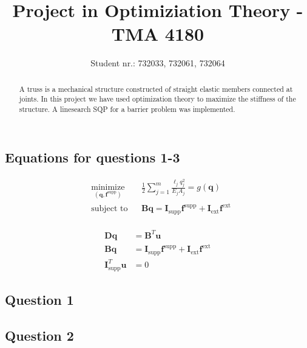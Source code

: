 \documentclass[10pt,a4paper]{article}
\begin{document}
\title{Project in Optimiziation Theory - TMA 4180}
\author{Student nr.: 732033, 732061, 732064}
\maketitle

\begin{abstract}
A truss is a mechanical structure constructed of straight elastic members connected at joints. In this project we have used optimization theory to maximize the stiffness of the structure. A linesearch SQP for a barrier problem was implemented.
\end{abstract}

\subsection*{Equations for questions 1-3}

\begin{equation}
 \begin{aligned}
 \label{eq:system5}
 & \underset{(\bm{q},\bm{f}^{\textrm{supp}})}{\text{minimize}}
 & & \frac{1}{2}\sum_{j=1}^{m}\frac{\ell_{j}q_{j}^{2}}{E_{j}A_{j}} = g(\bm{q}) \\
 & \text{subject to}
 & & \bm{Bq} = \bm{I}_{\textrm{supp}}\bm{f}^{\textrm{supp}} + \bm{I}_{\textrm{ext}}\bm{f}^{\textrm{ext}}
 \end{aligned}
\end{equation}
\\
\begin{equation}
\begin{aligned}
\label{eq:system4}
\bm{Dq} &= \bm{B}^{{T}}\bm{u}\\
\bm{Bq} &= \bm{I}_{\textrm{supp}}\bm{f}^{\textrm{supp}} + \bm{I}_{\textrm{ext}}\bm{f}^{\textrm{ext}}\\
\bm{I}_{\textrm{supp}}^{T}\bm{u} &= 0
\end{aligned}
\end{equation}


\subsection*{Question 1}



\subsection*{Question 2}

\end{document}
